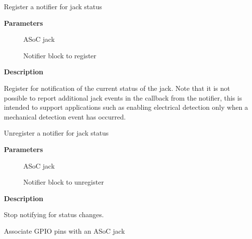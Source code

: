 \documentclass[a4paper,8pt,english]{sphinxmanual}
\begin{document}
\begin{fulllineitems}
\label{sound/kernel-api/alsa-driver-api:c.snd_soc_jack_notifier_register}
Register a notifier for jack status

\end{fulllineitems}


\textbf{Parameters}
\begin{description}
\item[{}] \leavevmode
ASoC jack

\item[{}] \leavevmode
Notifier block to register

\end{description}

\textbf{Description}

Register for notification of the current status of the jack.  Note
that it is not possible to report additional jack events in the
callback from the notifier, this is intended to support
applications such as enabling electrical detection only when a
mechanical detection event has occurred.

\begin{fulllineitems}
\label{sound/kernel-api/alsa-driver-api:c.snd_soc_jack_notifier_unregister}
Unregister a notifier for jack status

\end{fulllineitems}


\textbf{Parameters}
\begin{description}
\item[{}] \leavevmode
ASoC jack

\item[{}] \leavevmode
Notifier block to unregister

\end{description}

\textbf{Description}

Stop notifying for status changes.

\begin{fulllineitems}
\label{sound/kernel-api/alsa-driver-api:c.snd_soc_jack_add_gpios}
Associate GPIO pins with an ASoC jack

\end{fulllineitems}
\end{document}
